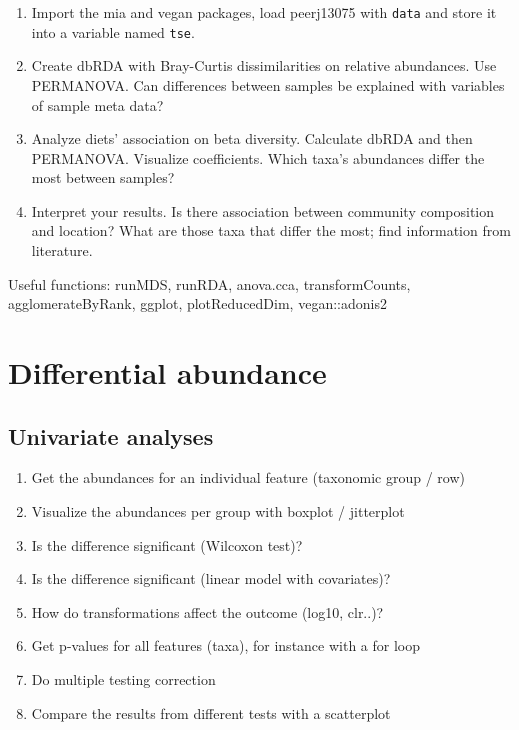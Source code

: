 \documentclass[
]{book}
\providecommand{\tightlist}{%
  \setlength{\itemsep}{0pt}\setlength{\parskip}{0pt}}
\begin{document}
\begin{enumerate}
\def\labelenumi{\arabic{enumi}.}
\tightlist
\item
  Import the mia and vegan packages, load peerj13075 with \texttt{data} and store it
  into a variable named \texttt{tse}.
\item
  Create dbRDA with Bray-Curtis dissimilarities on relative abundances. Use PERMANOVA. Can differences between samples be explained with variables of sample meta data?
\item
  Analyze diets' association on beta diversity. Calculate dbRDA and then PERMANOVA. Visualize coefficients. Which taxa's abundances differ the most between samples?
\item
  Interpret your results. Is there association between community composition and location? What are those taxa that differ the most; find information from literature.
\end{enumerate}

Useful functions: runMDS, runRDA, anova.cca, transformCounts, agglomerateByRank, ggplot, plotReducedDim, vegan::adonis2

\hypertarget{differential-abundance-1}{%
\section{Differential abundance}\label{differential-abundance-1}}

\hypertarget{univariate-analyses}{%
\subsection{Univariate analyses}\label{univariate-analyses}}

\begin{enumerate}
\def\labelenumi{\arabic{enumi}.}
\tightlist
\item
  Get the abundances for an individual feature (taxonomic group / row)
\item
  Visualize the abundances per group with boxplot / jitterplot
\item
  Is the difference significant (Wilcoxon test)?
\item
  Is the difference significant (linear model with covariates)?
\item
  How do transformations affect the outcome (log10, clr..)?
\item
  Get p-values for all features (taxa), for instance with a for loop
\item
  Do multiple testing correction
\item
  Compare the results from different tests with a scatterplot
\end{enumerate}
\end{document}
